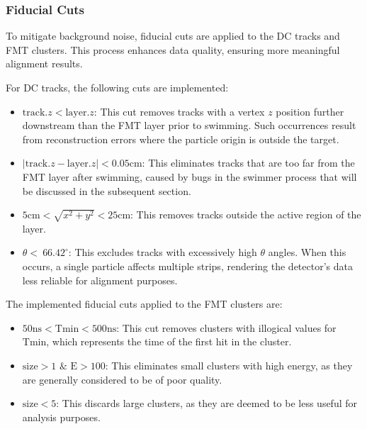 \subsubsection{Fiducial Cuts}
\label{12.21::fiducial_cuts}
    To mitigate background noise, fiducial cuts are applied to the DC tracks and FMT clusters.
    This process enhances data quality, ensuring more meaningful alignment results.

    For DC tracks, the following cuts are implemented:
    \begin{itemize}
        \item
            $\text{track}.z < \text{layer}.z$:
            This cut removes tracks with a vertex $z$ position further downstream than the FMT layer prior to swimming.
            Such occurrences result from reconstruction errors where the particle origin is outside the target.
        \item
            $\mid\text{track}.z - \text{layer}.z\mid < 0.05 \text{cm}$:
            This eliminates tracks that are too far from the FMT layer after swimming, caused by bugs in the swimmer process that will be discussed in the subsequent section.
        \item
            $5 \text{cm} < \sqrt{x^2 + y^2} < 25 \text{cm}$:
            This removes tracks outside the active region of the layer.
        \item
            $\theta < ~66.42^{\circ}$:
            This excludes tracks with excessively high $\theta$ angles.
            When this occurs, a single particle affects multiple strips, rendering the detector's data less reliable for alignment purposes.
    \end{itemize}

    The implemented fiducial cuts applied to the FMT clusters are:
    \begin{itemize}
        \item
            $50 \text{ns} < \text{T}{\text{min}} < 500 \text{ns}$:
            This cut removes clusters with illogical values for $\text{T}{\text{min}}$, which represents the time of the first hit in the cluster.
        \item
            $\text{size} > 1$ $\&$ $\text{E} > 100$:
            This eliminates small clusters with high energy, as they are generally considered to be of poor quality.
        \item
            $\text{size} < 5$:
            This discards large clusters, as they are deemed to be less useful for analysis purposes.
    \end{itemize}
